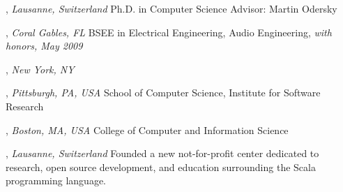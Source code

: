 \documentclass[9pt]{article}
\begin{document}



, \emph{Lausanne, Switzerland} \vspace{0.01in} 
\newline Ph.D. in Computer Science
\newline Advisor: Martin Odersky 

\bigskip

, \emph{Coral Gables, FL} \vspace{0.01in}  
\newline\noindent BSEE in Electrical Engineering, Audio Engineering, {\em with honors, May 2009}

\bigskip

, \emph{New York, NY} \vspace{0.01in}  

\bigskip

\medskip
{}

, \emph{Pittsburgh, PA, USA} \vspace{0.01in} 
\newline{}
\newline School of Computer Science, Institute for Software Research
\bigskip

, \emph{Boston, MA, USA} \vspace{0.01in} 
\newline{}
\newline College of Computer and Information Science
\bigskip

, \emph{Lausanne, Switzerland} \vspace{0.01in} 
\newline{}
\newline\noindent Founded a new not-for-profit center dedicated to research,
\newline\noindent open source development, and education surrounding the Scala
\newline\noindent programming language.
\bigskip
\end{document}

